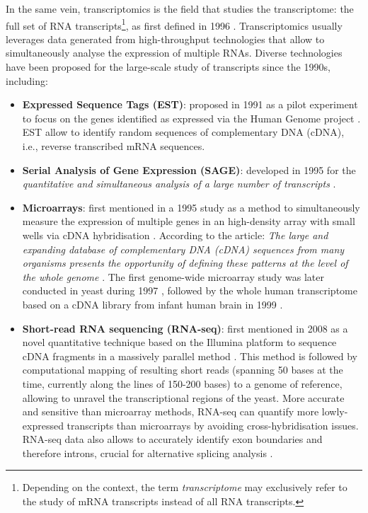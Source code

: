 In the same vein, transcriptomics is the field that studies the transcriptome: the full set of RNA transcripts\footnote{Depending on the context, the term \emph{transcriptome} may exclusively refer to the study of mRNA transcripts instead of all RNA transcripts.}, as first defined in 1996 \cite{pietu:1999tl}. Transcriptomics usually leverages data generated from high-throughput technologies that allow to simultaneously analyse the expression of multiple RNAs. Diverse technologies have been proposed for the large-scale study of transcripts since the 1990s, including:

\begin{itemize}
	\item \textbf{Expressed Sequence Tags (EST)}: proposed in 1991 as a pilot experiment to focus on the genes identified as expressed via the Human Genome project \cite{adams:1991ua}. EST allow to identify random sequences of complementary DNA (cDNA), i.e., reverse transcribed mRNA sequences.%
	\item \textbf{Serial Analysis of Gene Expression (SAGE)}: developed in 1995 for the \emph{quantitative and simultaneous analysis of a large number of transcripts} \cite{velculescu:1995vx}.
	\item \textbf{Microarrays}: first mentioned in a 1995 study as a method to simultaneously measure the expression of multiple genes in an high-density array with small wells via cDNA hybridisation \cite{schena:1995tu}. According to the article: \emph{The large and expanding database of complementary DNA (cDNA) sequences from many organisms presents the opportunity of defining these patterns at the level of the whole genome} \cite{schena:1995tu}. The first genome-wide microarray study was later conducted in yeast during 1997 \cite{lashkari:1997wh}, followed by the whole human transcriptome based on a cDNA library from infant human brain in 1999 \cite{pietu:1999tl}.
	\item \textbf{Short-read RNA sequencing (RNA-seq)}: first mentioned in 2008 as a novel quantitative technique based on the Illumina platform to sequence cDNA fragments in a massively parallel method \cite{nagalakshmi:2008vs}. This method is followed by computational mapping of resulting short reads (spanning 50 bases at the time, currently along the lines of 150-200 bases) to a genome of reference, allowing to unravel the transcriptional regions of the yeast. More accurate and sensitive than microarray methods, RNA-seq can quantify more lowly-expressed transcripts than microarrays by avoiding cross-hybridisation issues. RNA-seq data also allows to accurately identify exon boundaries and therefore introns, crucial for alternative splicing analysis \cite{nagalakshmi:2008vs}.

\end{itemize}
